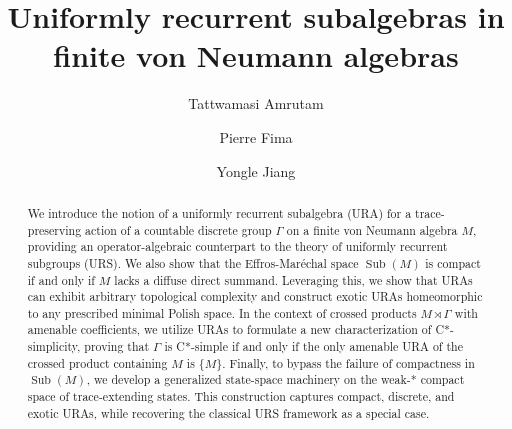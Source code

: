 \documentclass[12pt]{amsart} %
\title[Uniformly recurrent subalgebras]{Uniformly recurrent subalgebras in finite von Neumann algebras}
\date{}
\author[Amrutam]{Tattwamasi Amrutam}
\author[Fima]{Pierre Fima}
\author[Jiang]{Yongle Jiang}
\theoremstyle{plain}
\theoremstyle{definition}
\DeclareMathOperator{\Sub}{Sub}
\begin{document}
\begin{abstract}
We introduce the notion of a uniformly recurrent subalgebra (URA) for a trace-preserving action of a countable discrete group $\Gamma$ on a finite von Neumann algebra $M$, providing an operator-algebraic counterpart to the theory of uniformly recurrent subgroups (URS). We also show that the Effros-Mar\'echal space $\Sub(M)$ is compact if and only if $M$ lacks a diffuse direct summand. Leveraging this, we show that URAs can exhibit arbitrary topological complexity and construct exotic URAs homeomorphic to any prescribed minimal Polish space. In the context of crossed products $M \rtimes \Gamma$ with amenable coefficients, we utilize URAs to formulate a new characterization of C*-simplicity, proving that $\Gamma$ is C*-simple if and only if the only amenable URA of the crossed product containing $M$ is $\{M\}$. Finally, to bypass the failure of compactness in $\Sub(M)$, we develop a generalized state-space machinery on the weak-* compact space of trace-extending states. This construction captures compact, discrete, and exotic URAs, while recovering the classical URS framework as a special case.
\end{abstract}
\maketitle
\tableofcontents
\end{document}
